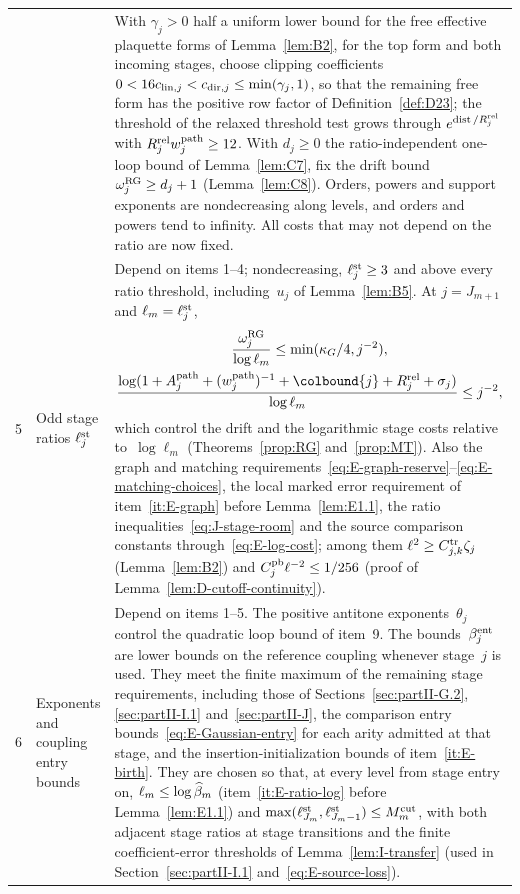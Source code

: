 \begin{longtable}{@{}p{}p{}p{}@{}}
 & & With $\gamma_j>0$ half a uniform lower bound for the free effective plaquette forms of Lemma~\ref{lem:B2}, for the top form and both incoming stages, choose clipping coefficients $0<16c_{{\rm lin},j}<c_{{\rm dir},j}\le\min(\gamma_j,1)$, so that the remaining free form has the positive row factor of Definition~\ref{def:D23}; the threshold of the relaxed threshold test grows through $e^{\operatorname{dist}/R_j^{\rm rel}}$ with $R_j^{\rm rel}w_j^{\rm path}\ge12$. With $d_j\ge0$ the ratio-independent one-loop bound of Lemma~\ref{lem:C7}, fix the drift bound $\omega_j^{\rm RG}\ge d_j+1$ (Lemma~\ref{lem:C8}). Orders, powers and support exponents are nondecreasing along levels, and orders and powers tend to infinity. All costs that may not depend on the ratio are now fixed.\\[3pt]
5 & \raggedright Odd stage ratios $\ell_j^{\rm st}$ & Depend on items 1--4; nondecreasing, $\ell_j^{\rm st}\ge3$ and above every ratio threshold, including~$u_j$ of Lemma~\ref{lem:B5}. At $j=J_{m+1}$ and $\ell_m=\ell_j^{\rm st}$,
\begin{gather*}
\frac{\omega_j^{\rm RG}}{\log\ell_m}\le\min(\slope/4,j^{-2}),\\
\frac{\log(1+A_j^{\rm path}+(w_j^{\rm path})^{-1}+\colbound{j}+R_j^{\rm rel}+\sigma_j)}{\log\ell_m}\le j^{-2},
\end{gather*}
which control the drift and the logarithmic stage costs relative to~$\log\ell_m$ (Theorems~\ref{prop:RG} and~\ref{prop:MT}). Also the graph and matching requirements~\eqref{eq:E-graph-reserve}--\eqref{eq:E-matching-choices}, the local marked error requirement of item~\ref{it:E-graph} before Lemma~\ref{lem:E1.1}, the ratio inequalities~\eqref{eq:J-stage-room} and the source comparison constants through~\eqref{eq:E-log-cost}; among them $\ell^2\ge C^{\rm tr}_{j,k}\zeta_j$ (Lemma~\ref{lem:B2}) and $C_j^{\rm pb}\ell^{-2}\le1/256$ (proof of Lemma~\ref{lem:D-cutoff-continuity}).\\[3pt]
6 & \raggedright Exponents and coupling entry bounds & Depend on items 1--5. The positive antitone exponents~$\theta_j$ control the quadratic loop bound of item~9. The bounds~$\beta_j^{\rm ent}$ are lower bounds on the reference coupling whenever stage~$j$ is used. They meet the finite maximum of the remaining stage requirements, including those of Sections~\ref{sec:partII-G.2}, \ref{sec:partII-I.1} and~\ref{sec:partII-J}, the comparison entry bounds~\eqref{eq:E-Gaussian-entry} for each arity admitted at that stage, and the insertion-initialization bounds of item~\ref{it:E-birth}. They are chosen so that, at every level from stage entry on, $\ell_m\le\log\widehat{\beta}_m$ (item~\ref{it:E-ratio-log} before Lemma~\ref{lem:E1.1}) and $\max(\ell^{\rm st}_{J_m},\ell^{\rm st}_{J_m-1})\le M^{\mathrm{cut}}_m$, with both adjacent stage ratios at stage transitions and the finite coefficient-error thresholds of Lemma~\ref{lem:I-transfer} (used in Section~\ref{sec:partII-I.1} and~\eqref{eq:E-source-loss}).\\[3pt]

\end{longtable}
